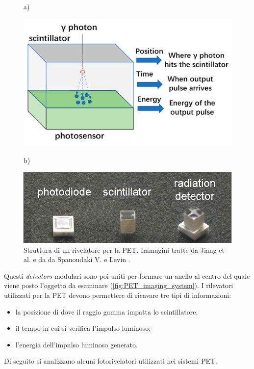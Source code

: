 \begin{figure}[tbh]
	\centering
	a)
	\begin{minipage}{.45\textwidth}
		\includegraphics[width=\linewidth]{./ImageFiles/PET_detectors.jpg}
	\end{minipage}
	b)
	\begin{minipage}{.45\textwidth}
		\includegraphics[width=\linewidth]{./ImageFiles/PET_detectors_real.jpg}
	\end{minipage}
	\caption{Struttura di un rivelatore per la PET. Immagini tratte da Jiang et al. \cite{Jiang2019} e da da Spanoudaki V. e Levin \cite{Spanoudaki2010}.}
	\label{fig:photodetectors}
\end{figure}
Questi \textit{detectors} modulari sono poi uniti per formare un anello al centro del quale viene posto l'oggetto da esaminare (\Fig\ref{fig:PET_imaging_system}). I rilevatori utilizzati per la PET devono permettere di ricavare tre tipi di informazioni:
\begin{itemize}
	\item la posizione di dove il raggio gamma impatta lo scintillatore;
	\item il tempo in cui si verifica l'impulso luminoso;
	\item l'energia dell'impulso luminoso generato.
\end{itemize}
Di seguito si analizzano alcuni fotorivelatori utilizzati nei sistemi PET.
\clearpage

